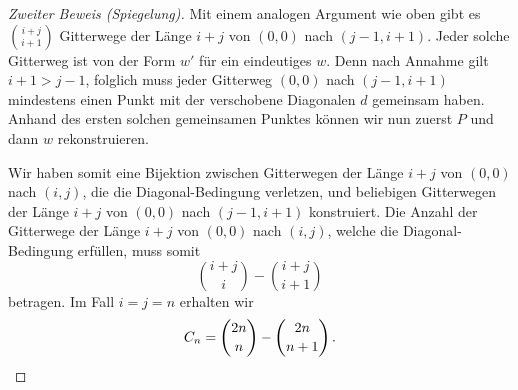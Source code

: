 \begin{proof}[Zweiter Beweis \textmd{(\emph{Spiegelung})}]
	Mit einem analogen Argument wie oben gibt es $\binom{i+j}{i+1}$ Gitterwege der Länge $i+j$ von $(0,0)$ nach $(j-1,i+1)$. Jeder solche Gitterweg ist von der Form $w'$ für ein eindeutiges $w$. Denn nach Annahme gilt $i+1>j-1$, folglich muss jeder Gitterweg $(0,0)$ nach $(j-1,i+1)$ mindestens einen Punkt mit der verschobene Diagonalen $d$ gemeinsam haben. Anhand des ersten solchen gemeinsamen Punktes können wir nun zuerst $P$ und dann $w$ rekonstruieren.
	
	Wir haben somit eine Bijektion zwischen Gitterwegen der Länge $i+j$ von $(0,0)$ nach $(i,j)$, die die Diagonal-Bedingung verletzen, und beliebigen Gitterwegen der Länge $i+j$ von $(0,0)$ nach $(j-1,i+1)$ konstruiert. Die Anzahl der Gitterwege der Länge $i+j$ von $(0,0)$ nach $(i,j)$, welche die Diagonal-Bedingung erfüllen, muss somit
	\begin{equation*}
		\binom{i+j}{i}-\binom{i+j}{i+1}
	\end{equation*}
	betragen. Im Fall $i=j=n$ erhalten wir
	\begin{equation*}
		C_n=\binom{2n}{n}-\binom{2n}{n+1}\,.\qedhere
	\end{equation*}
\end{proof}


